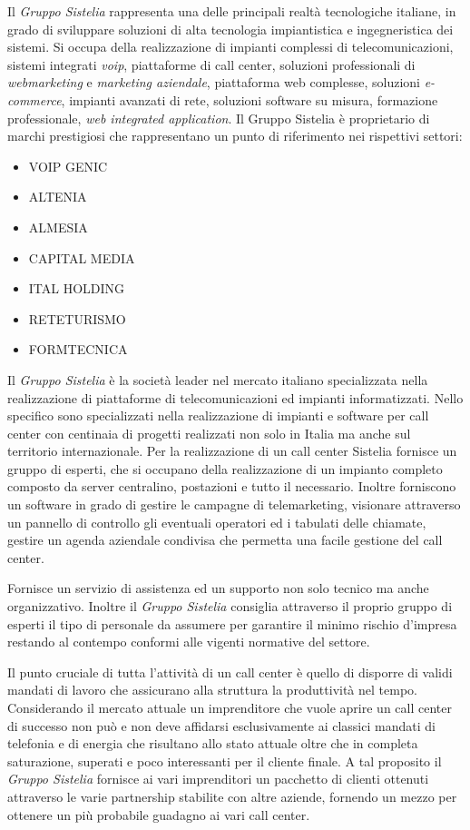 Il \textit{Gruppo Sistelia} rappresenta una delle principali realtà tecnologiche italiane, in grado di sviluppare soluzioni di alta tecnologia impiantistica e ingegneristica dei sistemi.
Si occupa della realizzazione di impianti complessi di telecomunicazioni, sistemi integrati \textit{voip}, piattaforme di call center, soluzioni professionali di \textit{webmarketing} e \textit{marketing aziendale}, piattaforma web complesse, soluzioni \textit{e-commerce}, impianti  avanzati di rete, soluzioni software su misura, formazione professionale, \textit{web integrated application}.
Il Gruppo Sistelia è proprietario di marchi prestigiosi che rappresentano un punto di riferimento nei rispettivi settori:
\begin{itemize}
\item VOIP GENIC
\item  ALTENIA
\item  ALMESIA 
\item  CAPITAL MEDIA
\item  ITAL HOLDING
\item RETETURISMO
\item FORMTECNICA
\end{itemize}

Il \textit{Gruppo Sistelia} è la società leader nel mercato italiano specializzata nella realizzazione di piattaforme di telecomunicazioni ed impianti informatizzati. Nello specifico sono specializzati nella realizzazione di impianti e software per call center con centinaia di progetti realizzati non solo in Italia ma anche sul territorio internazionale.
Per la realizzazione di un call center Sistelia fornisce un gruppo di esperti, che si occupano della realizzazione di un impianto completo composto da server centralino, postazioni e tutto il necessario.
Inoltre forniscono un software in grado di gestire le campagne di telemarketing, visionare attraverso un pannello di controllo gli eventuali operatori ed i tabulati delle chiamate, gestire un agenda aziendale condivisa che permetta una facile gestione del call center.

Fornisce un servizio di assistenza ed un supporto non solo tecnico ma anche organizzativo. Inoltre il \textit{Gruppo Sistelia} consiglia attraverso il proprio gruppo di esperti il tipo di personale da assumere per garantire il minimo rischio d'impresa restando al contempo conformi alle vigenti normative del settore.

Il punto cruciale di tutta l'attività di un call center è quello di disporre di validi mandati di lavoro che assicurano alla struttura la produttività nel tempo.
Considerando il mercato attuale un imprenditore che vuole aprire un call center di successo non può e non deve affidarsi esclusivamente ai classici mandati di telefonia e di energia che risultano allo stato attuale oltre che in completa saturazione, superati e poco interessanti per il cliente finale. 
A tal proposito il \textit{Gruppo Sistelia} fornisce ai vari imprenditori un pacchetto di clienti ottenuti attraverso le varie partnership stabilite con altre aziende, fornendo un mezzo per ottenere un più probabile guadagno ai vari call center. 

